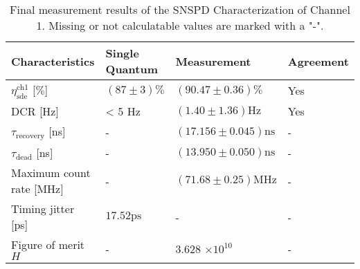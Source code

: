 \begin{table}[!hbt]
    \centering
    \begin{tabular}{|l|l|l|l|}
    \hline
    Characteristics & Single Quantum & Measurement & Agreement \\ \hline
    $\eta^{\text{ch1}}_{\text{sde}}$ [$\%$] & $(87 \pm 3)\%$  & $(90.47 \pm 0.36) \%$  & Yes \\ \hline
    DCR [Hz] & < 5 $\si{\Hz}$ & $(1.40 \pm 1.36) \si{\Hz}$ & Yes \\ \hline
    $\tau_{\text{recovery}}$ [ns] & - & $(17.156 \pm 0.045) \si{\nano\second}$ & - \\ \hline
    $\tau_{\text{dead}}$ [ns] & - & $(13.950 \pm 0.050) \si{\nano\second}$ & - \\ \hline
    Maximum count rate [MHz] & - & $(71.68 \pm 0.25) \si{\mega\Hz}$ & - \\ \hline
        Timing jitter [ps] & $ 17.52 \si{\pico\second}$ & - & - \\ \hline
        Figure of merit $H$ & - &  3.628 $\times 10^{10}$& - \\ \hline
    \end{tabular}
    \caption{Final measurement results of the SNSPD Characterization of Channel 1.
    Missing or not calculatable values are marked with a "-".}
    \label{tab:final_results_SNSPD_channel1}
\end{table}